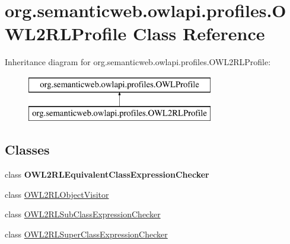 \hypertarget{classorg_1_1semanticweb_1_1owlapi_1_1profiles_1_1_o_w_l2_r_l_profile}{\section{org.\-semanticweb.\-owlapi.\-profiles.\-O\-W\-L2\-R\-L\-Profile Class Reference}
\label{classorg_1_1semanticweb_1_1owlapi_1_1profiles_1_1_o_w_l2_r_l_profile}
}
Inheritance diagram for org.\-semanticweb.\-owlapi.\-profiles.\-O\-W\-L2\-R\-L\-Profile\-:\begin{figure}[H]
\begin{center}
\leavevmode
\includegraphics[height=2.000000cm]{classorg_1_1semanticweb_1_1owlapi_1_1profiles_1_1_o_w_l2_r_l_profile}
\end{center}
\end{figure}
\subsection*{Classes}
\begin{DoxyCompactItemize}
\item 
class {\bfseries O\-W\-L2\-R\-L\-Equivalent\-Class\-Expression\-Checker}
\item 
class \hyperlink{classorg_1_1semanticweb_1_1owlapi_1_1profiles_1_1_o_w_l2_r_l_profile_1_1_o_w_l2_r_l_object_visitor}{O\-W\-L2\-R\-L\-Object\-Visitor}
\item 
class \hyperlink{classorg_1_1semanticweb_1_1owlapi_1_1profiles_1_1_o_w_l2_r_l_profile_1_1_o_w_l2_r_l_sub_class_expression_checker}{O\-W\-L2\-R\-L\-Sub\-Class\-Expression\-Checker}
\item 
class \hyperlink{classorg_1_1semanticweb_1_1owlapi_1_1profiles_1_1_o_w_l2_r_l_profile_1_1_o_w_l2_r_l_super_class_expression_checker}{O\-W\-L2\-R\-L\-Super\-Class\-Expression\-Checker}
\end{DoxyCompactItemize}
